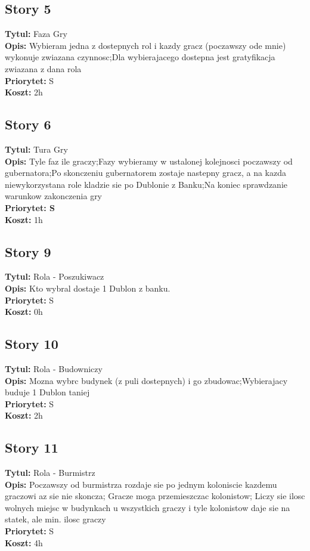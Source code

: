 \documentclass[12pt]{article}
\begin{document}
\subsection{Story 5}
\textbf{Tytul:} Faza Gry \\
\textbf{Opis:} Wybieram jedna z dostepnych rol i kazdy gracz (poczawszy ode
mnie) wykonuje zwiazana czynnosc;Dla wybierajacego dostepna jest
gratyfikacja zwiazana z dana rola \\
\textbf{Priorytet:} S \\
\textbf{Koszt:} 2h \\

\subsection{Story 6}
\textbf{Tytul:} Tura Gry \\
\textbf{Opis:} Tyle faz ile graczy;Fazy wybieramy w ustalonej kolejnosci
poczawszy od gubernatora;Po skonczeniu gubernatorem zostaje nastepny gracz, a na
kazda niewykorzystana role kladzie sie po Dublonie z Banku;Na koniec sprawdzanie
warunkow zakonczenia gry\\
\textbf{Priorytet: S}  \\
\textbf{Koszt:} 1h \\

\subsection{Story 9}
\textbf{Tytul:} Rola - Poszukiwacz \\
\textbf{Opis:} Kto wybral dostaje 1 Dublon z banku. \\
\textbf{Priorytet:} S \\
\textbf{Koszt:} 0h \\

\subsection{Story 10}
\textbf{Tytul:} Rola - Budowniczy \\
\textbf{Opis:} Mozna wybrc budynek (z puli dostepnych) i go zbudowac;Wybierajacy
buduje 1 Dublon taniej\\
\textbf{Priorytet:} S \\
\textbf{Koszt:} 2h \\

\subsection{Story 11}
\textbf{Tytul:} Rola - Burmistrz \\
\textbf{Opis:} Poczawszy od burmistrza rozdaje sie po jednym koloniscie kazdemu
graczowi az sie nie skoncza; Gracze moga przemieszczac kolonistow; Liczy sie
ilosc wolnych miejsc w budynkach u wszystkich graczy i tyle kolonistow daje sie
na statek, ale min. ilosc graczy\\
\textbf{Priorytet:} S \\
\textbf{Koszt:} 4h \\
\end{document}
